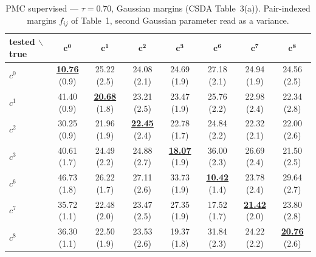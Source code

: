 \begin{table}[htbp]
  \centering
  \small
  \setlength{\tabcolsep}{4pt}
  \caption{PMC supervised — $\tau = 0.70$, Gaussian margins (CSDA Table~3(a)). Pair-indexed margins $f_{ij}$ of Table~1, second Gaussian parameter read as a variance.}
  \label{tab:exp1-high_tau_gauss}
  \begin{tabular}{lccccccc}
    \toprule
    tested $\backslash$ true & $\mathbf{c^{0}}$ & $\mathbf{c^{1}}$ & $\mathbf{c^{2}}$ & $\mathbf{c^{3}}$ & $\mathbf{c^{6}}$ & $\mathbf{c^{7}}$ & $\mathbf{c^{8}}$ \\
    \midrule
    $c^{0}$ & \textbf{\underline{10.76}} (0.9) & 25.22 (2.5) & 24.08 (2.1) & 24.69 (1.9) & 27.18 (2.1) & 24.94 (1.9) & 24.56 (2.5) \\
    $c^{1}$ & 41.40 (0.9) & \textbf{\underline{20.68}} (1.8) & 23.21 (2.5) & 23.47 (1.9) & 25.76 (2.2) & 22.98 (2.4) & 22.34 (2.8) \\
    $c^{2}$ & 30.25 (0.9) & 21.96 (1.9) & \textbf{\underline{22.45}} (2.4) & 22.78 (1.7) & 24.84 (2.2) & 22.32 (2.1) & 22.00 (2.6) \\
    $c^{3}$ & 40.61 (1.7) & 24.49 (2.2) & 24.88 (2.7) & \textbf{\underline{18.07}} (1.9) & 36.00 (2.3) & 26.69 (2.4) & 21.50 (2.5) \\
    $c^{6}$ & 46.73 (1.8) & 26.22 (1.7) & 27.11 (2.6) & 33.73 (1.9) & \textbf{\underline{10.42}} (1.4) & 23.78 (2.4) & 29.64 (2.7) \\
    $c^{7}$ & 35.72 (1.1) & 22.48 (2.0) & 23.47 (2.5) & 27.35 (1.9) & 17.52 (1.7) & \textbf{\underline{21.42}} (2.0) & 23.80 (2.8) \\
    $c^{8}$ & 36.30 (1.1) & 22.50 (1.9) & 23.53 (2.6) & 19.37 (1.8) & 31.84 (2.3) & 24.22 (2.2) & \textbf{\underline{20.76}} (2.6) \\
    \bottomrule
  \end{tabular}
\end{table}
